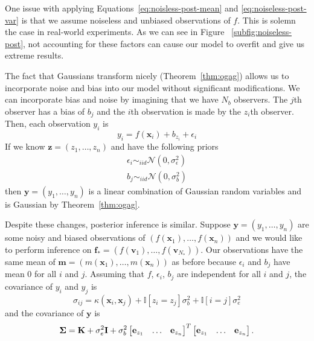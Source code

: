One issue with applying Equations~\ref{eq:noisless-post-mean} and \ref{eq:noiseless-post-var} is that we assume noiseless and unbiased observations of $f$.
This is solemn the case in real-world experiments.
As we can see in Figure ~\ref{subfig:noiseless-post}, not accounting for these factors can cause our model to overfit and give us extreme results.

The fact that Gaussians transform nicely (Theorem~\ref{thm:ogag}) allows us to incorporate noise and bias into our model without significant modifications.
We can incorporate bias and noise by imagining that we have $N_b$ observers.
The $j$th observer has a bias of $b_j$ and the $i$th observation is made by the $z_i$th observer.
Then, each observation $y_i$ is
\begin{equation*}
    y_i = f(\mathbf{x}_i) + b_{z_i} + \epsilon_i
\end{equation*}
If we know $\mathbf{z} = (z_1, \ldots, z_n)$ 
and have the following priors
\begin{align*}
    \epsilon_i \sim_{iid} \mathcal{N}(0, \sigma^2_{\epsilon}) \\
    b_j \sim_{iid} \mathcal{N}(0, \sigma_{b}^2)
\end{align*}
then $\mathbf{y} = (y_1, \ldots, y_n)$ is a linear combination of Gaussian random variables
and is Gaussian by Theorem~\ref{thm:ogag}.

Despite these changes, posterior inference is similar.
Suppose $\mathbf{y} = (y_1, \ldots, y_n)$ are some noisy and biased observations of $(f(\mathbf{x}_1), \ldots, f(\mathbf{x}_n))$
and we would like to perform inference on $\mathbf{f}_* = (f(\mathbf{v}_1), \ldots, f(\mathbf{v}_{N_{*}}))$.
Our observations have the same mean of $\mathbf{m} = (m(\mathbf{x}_1), \ldots, m(\mathbf{x}_n))$ as before because $\epsilon_i$ and $b_j$ have mean 0 for all $i$ and $j$.
Assuming that $f$, $\epsilon_i$, $b_j$ are independent for all $i$ and $j$,
the covariance of $y_i$ and $y_j$ is
\begin{equation*}
    \sigma_{ij} = \kappa(\mathbf{x}_i, \mathbf{x}_j) + \mathbb{I}[z_i = z_j] \sigma^2_b + \mathbb{I}[i = j]\sigma^2_e
\end{equation*}
and the covariance of $\mathbf{y}$ is
\begin{equation*}
    \boldsymbol{\Sigma} = \mathbf{K} + \sigma^{2}_e \mathbf{I} + \sigma_b^2 \begin{bmatrix}
        \mathbf{e}_{z_1} & \hdots & \mathbf{e}_{z_n}
    \end{bmatrix}^{ T}
     \begin{bmatrix}
        \mathbf{e}_{z_1} & \hdots & \mathbf{e}_{z_n}
    \end{bmatrix}.
\end{equation*}

